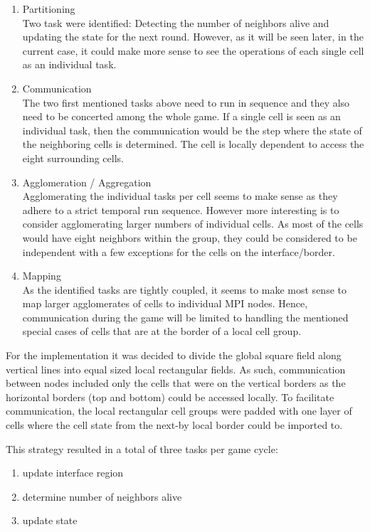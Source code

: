 \documentclass[a4paper,11pt,twoside,table,xcdraw]{article}
\begin{document}
\begin{enumerate}
\item Partitioning\\
Two task were identified: Detecting the number of neighbors alive and updating the state for the next round. However, as it will be seen later, in the current case, it could make more sense to see the operations of each single cell as an individual task.
\item Communication\\
The two first mentioned tasks above need to run in sequence and they also need to be concerted among the whole game. If a single cell is seen as an individual task, then the communication would be the step where the state of the neighboring cells is determined. The cell is locally dependent to access the eight surrounding cells. 
\item Agglomeration / Aggregation\\
Agglomerating the individual tasks per cell seems to make sense as they adhere to a strict temporal run sequence. However more interesting is to consider agglomerating larger numbers of individual cells. As most of the cells would have eight neighbors within the group, they could be considered to be independent with a few exceptions for the cells on the interface/border. 
\item Mapping\\
As the identified tasks are tightly coupled, it seems to make most sense to map larger agglomerates of cells to individual MPI nodes. Hence, communication during the game will be limited to handling the mentioned special cases of cells that are at the border of a local cell group. 
\end{enumerate}

For the implementation it was decided to divide the global square field along vertical lines into equal sized local rectangular fields. As such, communication between nodes included only the cells that were on the vertical borders as the horizontal borders (top and bottom) could be accessed locally. To facilitate communication, the local rectangular cell groups were padded with one layer of cells where the cell state from the next-by local border could be imported to.

This strategy resulted in a total of three tasks per game cycle:
\begin{enumerate}
\item update interface region
\item determine number of neighbors alive
\item update state
\end{enumerate}
\end{document}
